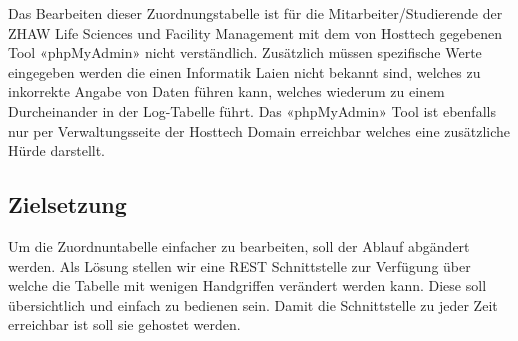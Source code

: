\documentclass[../main.tex]{subfiles}
\begin{document}
	Das Bearbeiten dieser Zuordnungstabelle ist für die Mitarbeiter/Studierende der ZHAW Life Sciences und Facility Management mit dem von Hosttech gegebenen Tool «phpMyAdmin» nicht verständlich. Zusätzlich müssen spezifische Werte eingegeben werden die einen Informatik Laien nicht bekannt sind, welches zu inkorrekte Angabe von Daten führen kann, welches wiederum zu einem Durcheinander in der Log-Tabelle führt. 
	Das «phpMyAdmin» Tool ist ebenfalls nur per Verwaltungsseite der Hosttech Domain erreichbar welches eine zusätzliche Hürde darstellt.
	
	\subsection{Zielsetzung}
	Um die Zuordnuntabelle einfacher zu bearbeiten, soll der Ablauf abgändert werden. Als Lösung stellen wir eine REST Schnittstelle zur Verfügung über welche die Tabelle mit wenigen Handgriffen verändert werden kann. 
	Diese soll übersichtlich und einfach zu bedienen sein. Damit die Schnittstelle zu jeder Zeit erreichbar ist soll sie gehostet werden.
\end{document}
